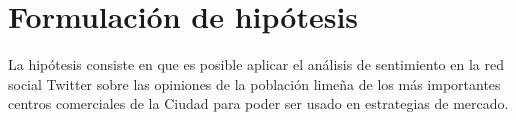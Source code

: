%
\chapter{Formulaci\'on de hip\'otesis}

La hip\'otesis consiste en que es posible aplicar el an\'alisis de sentimiento en la red social Twitter sobre las opiniones de la población lime\~na de los más importantes centros comerciales de la Ciudad para poder ser usado en estrategias de mercado.

\cleardoublepage